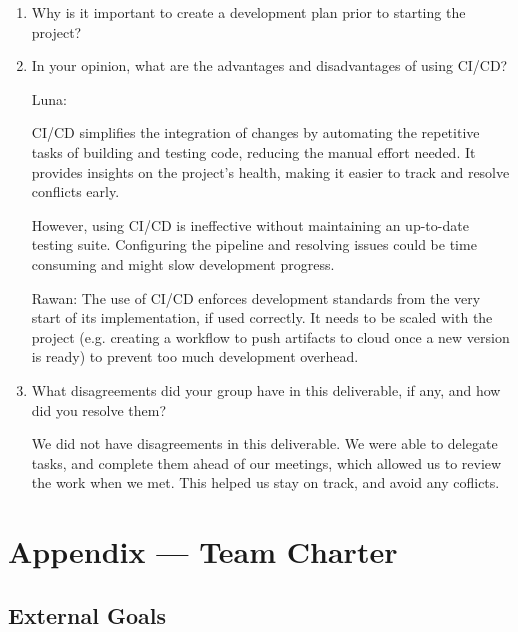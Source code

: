\documentclass{article}
\begin{document}
\begin{enumerate}
    \item Why is it important to create a development plan prior to starting the
    project?
    \item In your opinion, what are the advantages and disadvantages of using
    CI/CD?
    
    Luna:

CI/CD simplifies the integration of changes by automating the repetitive tasks of building and testing code, reducing the manual effort needed. It provides insights on the project’s health, making it easier to track and resolve conflicts early. 

However, using CI/CD is ineffective without maintaining an up-to-date testing suite. Configuring the pipeline and resolving issues could be time consuming and might slow development progress.

Rawan: The use of CI/CD enforces development standards from the very start of its implementation, if used correctly. It needs to be scaled with the project (e.g. creating a workflow to push artifacts to cloud once a new version is ready) to prevent too much development overhead. 

    \item What disagreements did your group have in this deliverable, if any,
    and how did you resolve them?

    We did not have disagreements in this deliverable. We were able to delegate tasks, and complete them ahead of our meetings, which allowed us to review the work when we met. This helped us stay on track, and avoid any coflicts. 
\end{enumerate}

\newpage{}

\section*{Appendix --- Team Charter}


\subsection*{External Goals}

\begin{comment}
\wss{What are your team's external goals for this project? These are not the
goals related to the functionality or quality fo the project.  These are the
goals on what the team wishes to achieve with the project.  Potential goals are
to win a prize at the Capstone EXPO, or to have something to talk about in
interviews, or to get an A+, etc.}
\end{comment}
\end{document}
